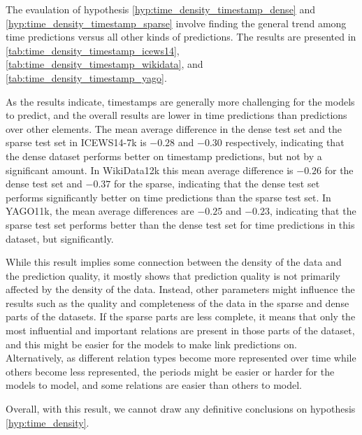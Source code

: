 
The evaulation of hypothesis \autoref{hyp:time_density_timestamp_dense} and \autoref{hyp:time_density_timestamp_sparse} involve finding the general trend among time predictions versus all other kinds of predictions. The results are presented in \autoref{tab:time_density_timestamp_icews14}, \autoref{tab:time_density_timestamp_wikidata}, and \autoref{tab:time_density_timestamp_yago}.

%
%
%

As the results indicate, timestamps are generally more challenging for the models to predict, and the overall results are lower in time predictions than predictions over other elements.
The mean average difference in the dense test set and the sparse test set in \mbox{ICEWS14-7k} is $-0.28$ and $-0.30$ respectively, indicating that the dense dataset performs better on timestamp predictions, but not by a significant amount.
In WikiData12k this mean average difference is $-0.26$ for the dense test set and $-0.37$ for the sparse, indicating that the dense test set performs significantly better on time predictions than the sparse test set.
In YAGO11k, the mean average differences are $-0.25$ and $-0.23$, indicating that the sparse test set performs better than the dense test set for time predictions in this dataset, but significantly.

While this result implies some connection between the density of the data and the prediction quality, it mostly shows that prediction quality is not primarily affected by the density of the data. Instead, other parameters might influence the results such as the quality and completeness of the data in the sparse and dense parts of the datasets. If the sparse parts are less complete, it means that only the most influential and important relations are present in those parts of the dataset, and this might be easier for the models to make link predictions on. Alternatively, as different relation types become more represented over time while others become less represented, the periods might be easier or harder for the models to model, and some relations are easier than others to model.

Overall, with this result, we cannot draw any definitive conclusions on hypothesis \autoref{hyp:time_density}.


